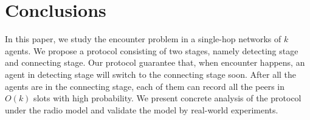 \section{Conclusions}
\label{sectionconclusion}

In this paper, we study the encounter problem in a single-hop networks of $k$ 
agents. We propose a protocol consisting of two stages, namely detecting stage and 
connecting stage. Our protocol guarantee that, when encounter happens, an agent in detecting stage will switch 
to the connecting stage soon. After all the agents are in the connecting stage,  
each of them can record all the peers in $O(k)$ slots with high probability.
We present concrete analysis of the protocol under the radio model and validate the model 
by real-world experiments. 
